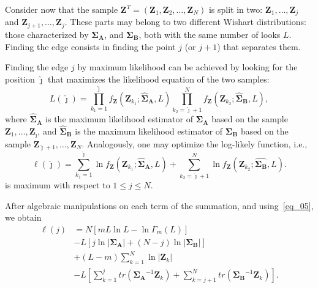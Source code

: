 \documentclass[conference]{IEEEtran}
\begin{document}
Consider now that the sample $\mathbf{Z}^T=(\mathbf{Z}_1,\mathbf{Z}_2,\dots,\mathbf{Z}_N)$ is split in two: $\mathbf{Z}_1,\dots,\mathbf{Z}_j$ and $\mathbf{Z}_{j+1},\dots,\mathbf{Z}_j$.
These parts may belong to two different Wishart distributions: those characterized by  $\mathbf{\Sigma_A}$, and $\mathbf{\Sigma_B}$, both with the same number of looks $L$.
Finding the edge consists in finding the point $j$ (or $j+1$) that separates them.


Finding the edge $j$ by maximum likelihood can be achieved by looking for the position $\widehat\jmath$ that maximizes the likelihood equation of the two samples:
%
\begin{equation}
	L(\widehat\jmath)=\prod_{k_1=1}^{\widehat\jmath}f_{\mathbf{Z}}(\mathbf{Z}_{k_1};\mathbf{\widehat\Sigma_{A}},L) \prod_{k_2=\widehat\jmath+1}^{N}f_{\mathbf{Z}}(\mathbf{Z}_{k_2};\mathbf{\widehat\Sigma_{B}},L),
	\label{eq_10}
\end{equation}
where $\mathbf{\widehat\Sigma_{A}}$ is the maximum likelihood estimator of $\mathbf{\Sigma_{A}}$ based on the sample $\mathbf{Z}_1,\dots,\mathbf{Z}_{\widehat\jmath}$, 
and $\mathbf{\widehat\Sigma_{B}}$ is the maximum likelihood estimator of $\mathbf{\Sigma_{B}}$ based on the sample $\mathbf{Z}_{\widehat\jmath+1},\dots,\mathbf{Z}_{N}$.
Analogously, one may optimize the log-likely function, i.e.,
\begin{equation}
\ell(\widehat\jmath) =
	\sum_{k_1=1}^{\widehat\jmath}\ln f_{\mathbf{Z}}(\mathbf{Z}_{k_1}; \mathbf{\widehat\Sigma_{A}},L) + \sum_{k_2=\widehat\jmath+1}^{N}\ln f_{\mathbf{Z}}(\mathbf{Z}_{k_2};\widehat{\mathbf{\Sigma_{B}}},L).
	\label{eq_11}
\end{equation}
is maximum with respect to $1\leq j\leq N$.

After algebraic manipulations on each term of the summation, and using~\eqref{eq_05}, we obtain
\begin{align}
	\ell(j)&=N\left[mL\ln{L}-\ln{\Gamma_m(L)}\right]\\
	&- L\left[j\ln{|\mathbf{\Sigma_{A}}|}+(N-j)\ln{|\mathbf{\Sigma_{B}}|}\right] \\
	&+(L-m)\sum_{k=1}^{N}\ln{|\mathbf{Z}_{k}|}\\
	&-L\left[\sum_{k=1}^{j}tr(\mathbf{\Sigma_{A}}^{-1}\mathbf{Z}_{k})+ \sum_{k=j+1}^{N}tr(\mathbf{\Sigma_{B}}^{-1}\mathbf{Z}_{k})\right].
	\label{eq_12}
\end{align}
\end{document}
